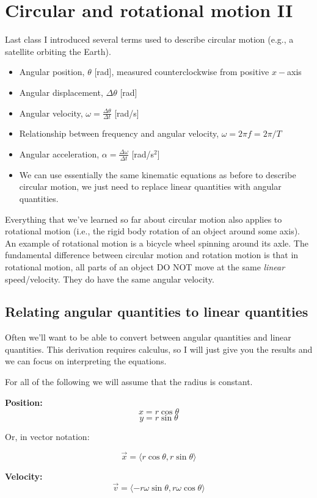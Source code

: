 \section{Circular and rotational motion II}
Last class I introduced several terms used to describe circular motion (e.g., a satellite orbiting the Earth).
\begin{itemize}
\itemsep 0pt
\item Angular position, $\theta$ [rad], measured counterclockwise from positive $x-$axis
\item Angular displacement, $\Delta\theta$ [rad]
\item Angular velocity, $\omega=\frac{\Delta\theta}{\Delta{t}}$ [rad/s]
\item Relationship between frequency and angular velocity, $\omega=2\pi f =2\pi/T$
\item Angular acceleration, $\alpha=\frac{\Delta\omega}{\Delta{t}}$ [rad/s$^2$]
\item We can use essentially the same kinematic equations as before to describe circular motion, we just need to replace linear quantities with angular quantities.
\end{itemize}

Everything that we've learned so far about circular motion also applies to rotational motion (i.e., the rigid body rotation of an object around some axis). An example of rotational motion is a bicycle wheel spinning around its axle. The fundamental difference between circular motion and rotation motion is that in rotational motion, all parts of an object DO NOT move at the same \textit{linear} speed/velocity. They do have the same angular velocity.


\subsection{Relating angular quantities to linear quantities}
Often we'll want to be able to convert between angular quantities and linear quantities. This derivation requires calculus, so I will just give you the results and we can focus on interpreting the equations.

For all of the following we will assume that the radius is constant.

\textbf{Position:}
$$x=r\cos\theta$$
$$y=r\sin\theta$$

Or, in vector notation:

$$\boxed{\vec x=\langle{r\cos\theta,r\sin\theta}\rangle}$$

\textbf{Velocity:}
$$\boxed{\vec{v}=\langle{-r\omega\sin\theta,r\omega\cos\theta}\rangle}$$

